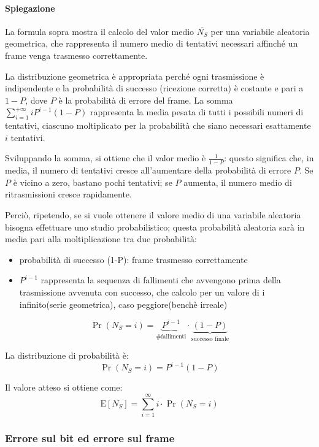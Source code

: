 \paragraph{Spiegazione}
La formula sopra mostra il calcolo del valor medio $\overline{N_S}$ per una variabile aleatoria geometrica, che rappresenta il numero medio di tentativi necessari affinché un frame venga trasmesso correttamente. 

La distribuzione geometrica è appropriata perché ogni trasmissione è indipendente e la probabilità di successo (ricezione corretta) è costante e pari a $1-P$, dove $P$ è la probabilità di errore del frame. La somma $\sum_{i=1}^{+\infty} i P^{i-1}(1-P)$ rappresenta la media pesata di tutti i possibili numeri di tentativi, ciascuno moltiplicato per la probabilità che siano necessari esattamente $i$ tentativi. 

Sviluppando la somma, si ottiene che il valor medio è $\frac{1}{1-P}$: questo significa che, in media, il numero di tentativi cresce all'aumentare della probabilità di errore $P$. Se $P$ è vicino a zero, bastano pochi tentativi; se $P$ aumenta, il numero medio di ritrasmissioni cresce rapidamente.

Perciò, ripetendo, se si vuole ottenere il valore medio di una variabile aleatoria bisogna effettuare uno studio probabilistico; questa probabilità aleatoria sarà in media pari alla moltiplicazione tra due probabilità:
\begin{itemize}
    \item probabilità di successo (1-P): frame trasmesso correttamente
    \item $P^{i-1}$ rappresenta la sequenza di fallimenti che avvengono prima della trasmissione avvenuta con successo, che calcolo per un valore di i infinito(serie geometrica), caso peggiore(benchè irreale)
\end{itemize}


\[
\Pr(N_S = i) = \underbrace{P^{i-1}}_{\text{\# fallimenti}} \cdot \underbrace{(1 - P)}_{\text{successo finale}}
\]

La distribuzione di probabilità è:
\[
\Pr(N_S = i) = P^{i - 1} (1 - P)
\]

Il valore atteso si ottiene come:
\[
\mathrm{E}[N_S] = \sum_{i = 1}^{\infty} i \cdot \Pr(N_S = i)
\]

\newpage

\subsubsection{Errore sul bit ed errore sul frame}
